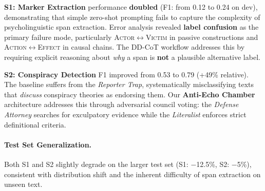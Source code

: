 \documentclass[11pt]{article}
\begin{document}
\textbf{S1: Marker Extraction}
performance \textbf{doubled} (F1: from 0.12 to 0.24 on dev), demonstrating that simple zero-shot prompting fails to capture the
complexity of psycholinguistic span extraction. Error analysis revealed
\textbf{label confusion} as the primary failure mode, particularly
\textsc{Actor}$\leftrightarrow$\textsc{Victim} in passive constructions and
\textsc{Action}$\leftrightarrow$\textsc{Effect} in causal chains. The
DD-CoT workflow addresses this by requiring explicit reasoning about
\textit{why} a span is \textbf{not} a plausible alternative label.

\textbf{S2: Conspiracy Detection}
F1 improved from 0.53 to 0.79 (+49\% relative). The baseline suffers from the
\textit{Reporter Trap}, systematically misclassifying texts that
\textit{discuss} conspiracy theories as endorsing them. Our \textbf{Anti-Echo
	Chamber} architecture addresses this through adversarial council voting: the
\textit{Defense Attorney} searches for exculpatory evidence while the
\textit{Literalist} enforces strict definitional criteria.

\paragraph{Test Set Generalization.}
Both S1 and S2 slightly degrade on the larger test set (S1: $-$12.5\%, S2: $-$5\%),
consistent with distribution shift and the inherent difficulty of span
extraction on unseen text.
\end{document}
